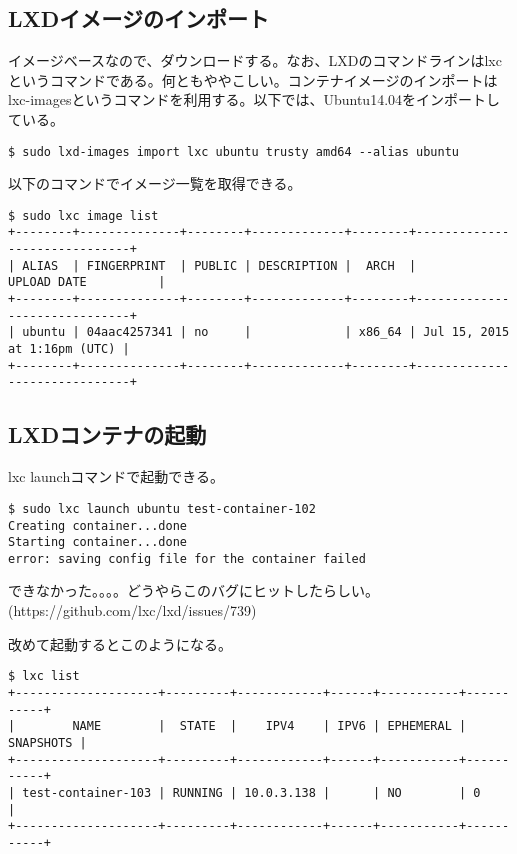 \documentclass[9pt,b5paper,tombo]{jsbook}
\begin{document}
\subsection{LXDイメージのインポート}
イメージベースなので、ダウンロードする。なお、LXDのコマンドラインはlxcというコマンドである。何ともややこしい。コンテナイメージのインポートはlxc-imagesというコマンドを利用する。以下では、Ubuntu14.04をインポートしている。

\begin{lstlisting}
$ sudo lxd-images import lxc ubuntu trusty amd64 --alias ubuntu
\end{lstlisting}

\noindent
以下のコマンドでイメージ一覧を取得できる。
\begin{lstlisting}
$ sudo lxc image list
+--------+--------------+--------+-------------+--------+------------------------------+
| ALIAS  | FINGERPRINT  | PUBLIC | DESCRIPTION |  ARCH  |         UPLOAD DATE          |
+--------+--------------+--------+-------------+--------+------------------------------+
| ubuntu | 04aac4257341 | no     |             | x86_64 | Jul 15, 2015 at 1:16pm (UTC) |
+--------+--------------+--------+-------------+--------+------------------------------+
\end{lstlisting}

\newpage

\subsection{LXDコンテナの起動}
lxc launchコマンドで起動できる。
\begin{lstlisting}
$ sudo lxc launch ubuntu test-container-102
Creating container...done
Starting container...done
error: saving config file for the container failed
\end{lstlisting}

\noindent
できなかった。。。。どうやらこのバグにヒットしたらしい。(https://github.com/lxc/lxd/issues/739)

\noindent
改めて起動するとこのようになる。
\begin{lstlisting}
$ lxc list
+--------------------+---------+------------+------+-----------+-----------+
|        NAME        |  STATE  |    IPV4    | IPV6 | EPHEMERAL | SNAPSHOTS |
+--------------------+---------+------------+------+-----------+-----------+
| test-container-103 | RUNNING | 10.0.3.138 |      | NO        | 0         |
+--------------------+---------+------------+------+-----------+-----------+
\end{lstlisting}
\end{document}
